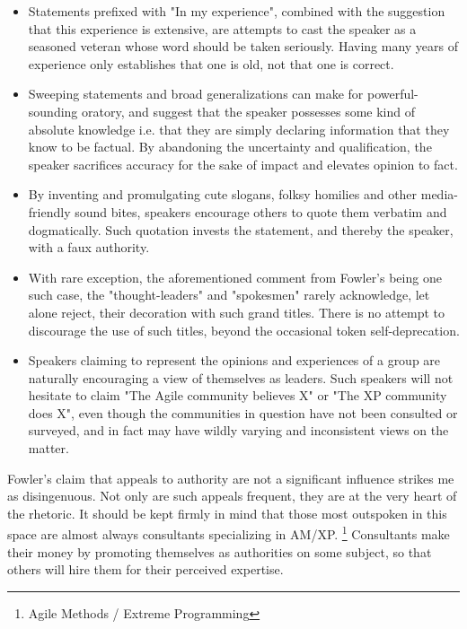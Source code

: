 \documentclass{article}
\begin{document}
\begin{enumerate}
\begin{itemize}
\item Statements prefixed with "In my experience", combined with the
suggestion that this experience is extensive, are attempts to cast
the speaker as a seasoned veteran whose word should be taken
seriously. Having many years of experience only establishes that one
is old, not that one is correct.\\
\item Sweeping statements and broad generalizations can make for
powerful-sounding oratory, and suggest that the speaker possesses
some kind of absolute knowledge i.e. that they are simply declaring
information that they know to be factual. By abandoning the
uncertainty and qualification, the speaker sacrifices accuracy for
the sake of impact and elevates opinion to fact.\\
\item By inventing and promulgating cute slogans, folksy homilies and other
media-friendly sound bites, speakers encourage others to quote them
verbatim and dogmatically. Such quotation invests the statement, and
thereby the speaker, with a faux authority.\\
\item With rare exception, the aforementioned comment from Fowler's being
one such case, the "thought-leaders" and "spokesmen" rarely
acknowledge, let alone reject, their decoration with such grand
titles. There is no attempt to discourage the use of such titles,
beyond the occasional token self-deprecation.\\
\item Speakers claiming to represent the opinions and experiences of a
group are naturally encouraging a view of themselves as leaders. Such
speakers will not hesitate to claim "The Agile community believes X"
or "The XP community does X", even though the communities in question
have not been consulted or surveyed, and in fact may have wildly
varying and inconsistent views on the matter.
\end{itemize}

Fowler's claim that appeals to authority are not a significant influence
strikes me as disingenuous. Not only are such appeals frequent, they are
at the very heart of the rhetoric. It should be kept firmly in mind that
those most outspoken in this space are almost always consultants
specializing in AM/XP. \footnote{Agile Methods / Extreme Programming} Consultants make their money by promoting
themselves as authorities on some subject, so that others will hire them
for their perceived expertise.


\end{enumerate}
\end{document}
